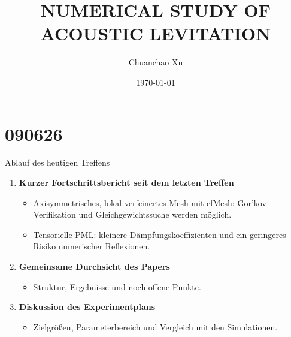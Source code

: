 \documentclass[
	german,%
	accentcolor=9c,%
	accept-missing-logos=true,%
]{tudabeamer}
\title{NUMERICAL STUDY OF ACOUSTIC LEVITATION}
\author{Chuanchao Xu}
\institute{Mathematical Modeling and Analysis}
\date{\today}%
\begin{document}
\maketitle

\section{090626}
\begin{frame}{Ablauf des heutigen Treffens}
    \begin{enumerate}
        \item \textbf{Kurzer Fortschrittsbericht seit dem letzten Treffen}
        \begin{itemize}
            \item Axisymmetrisches, lokal verfeinertes Mesh mit cfMesh:
            Gor'kov-Verifikation und Gleichgewichtssuche werden möglich.
            \item Tensorielle PML: kleinere Dämpfungskoeffizienten und ein
            geringeres Risiko numerischer Reflexionen.
        \end{itemize}
        \item \textbf{Gemeinsame Durchsicht des Papers}
        \begin{itemize}
            \item Struktur, Ergebnisse und noch offene Punkte.
        \end{itemize}
        \item \textbf{Diskussion des Experimentplans}
        \begin{itemize}
            \item Zielgrößen, Parameterbereich und Vergleich mit den Simulationen.
        \end{itemize}
    \end{enumerate}
\end{frame}
\end{document}
